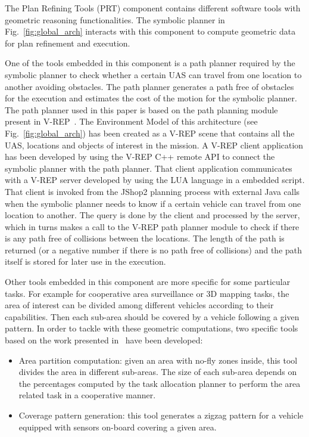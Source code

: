 \documentclass[twocolumn]{svjour3}          %
\begin{document}
The Plan Refining Tools (PRT) component contains different software tools with geometric reasoning functionalities. The symbolic planner in Fig.~\ref{fig:global_arch} interacts with this component to compute geometric data for plan refinement and execution. 

One of the tools embedded in this component is a path planner required by the symbolic planner to check whether a certain UAS can travel from one location to another avoiding obstacles. The path planner generates a path free of obstacles for the execution and estimates the cost of the motion for the symbolic planner. The path planner used in this paper is based on the path planning module present in V-REP~\cite{vrep_iros13}. The Environment Model of this architecture (see Fig.~\ref{fig:global_arch}) has been created as a V-REP scene that contains all the UAS, locations and objects of interest in the mission. A V-REP client application has been developed by using the V-REP C++ remote API to connect the symbolic planner with the path planner. That client application communicates with a V-REP server developed by using the LUA language in a embedded script. That client is invoked from the JShop2 planning process with external Java calls when the symbolic planner needs to know if a certain vehicle can travel from one location to another. The query is done by the client and processed by the server, which in turns makes a call to the V-REP path planner module to check if there is any path free of collisions between the locations. The length of the path is returned (or a negative number if there is no path free of collisions) and the path itself is stored for later use in the execution.

Other tools embedded in this component are more specific for some particular tasks. For example for cooperative area surveillance or 3D mapping tasks, the area of interest can be divided among different vehicles according to their capabilities. Then each sub-area should be covered by a vehicle following a given pattern. In order to tackle with these geometric computations, two specific tools based on the work presented in~\cite{maza_dars07} have been developed:
\begin{itemize}
\item Area partition computation: given an area with no-fly zones inside, this tool divides the area in different sub-areas. The size of each sub-area depends on the percentages computed by the task allocation planner to perform the area related task in a cooperative manner.
\item Coverage pattern generation: this tool generates a zigzag pattern for a vehicle equipped with sensors on-board covering a given area.
\end{itemize}
 
\end{document}
